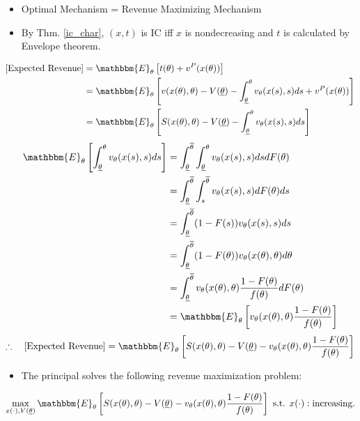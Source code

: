\documentclass[11pt,a4paper,dvipdfmx]{article}
\theoremstyle{plain}
\renewcommand{\bar}{\overline}
\newcommand{\E}{\mathbbm{E}}
\newcommand{\1}{\mathbbm{1}}
\begin{document}
\begin{itemize}
	\item Optimal Mechanism = Revenue Maximizing Mechanism
	\item By Thm. \ref{ic_char}, $(x, t)$ is IC iff $x$ is nondecreasing and $t$ is calculated by Envelope theorem.
\end{itemize}
\begin{align*}
	\text{[Expected Revenue]}
	&=
	\E_\theta \left[
	t(\theta) + v^P(x(\theta))
	\right] \\
	&=
	\E_\theta \left[
	v(x(\theta), \theta) - V(\underline{\theta}) - \int_{\underline{\theta}}^\theta
	 v_\theta(x(s), s) ds + v^P(x(\theta))
	\right] \\
	&= \E_\theta \left[
	S(x(\theta), \theta) - V(\underline{\theta}) - \int_{\underline{\theta}}^\theta
	 v_\theta(x(s), s) ds
	\right]
\end{align*}
\begin{align*}
	\E_\theta \left[
	\int_{\underline{\theta}}^\theta
	 v_\theta(x(s), s) ds
	\right]
	&=
	\int_{\underline{\theta}}^{\bar{\theta}}
	\int_{\underline{\theta}}^\theta
	 v_\theta(x(s), s) ds
	d F(\theta) \\
	&= 
	\int_{\underline{\theta}}^{\bar{\theta}}
	\int_{s}^{\bar{\theta}}
	 v_\theta(x(s), s) 
	dF(\theta) ds \\
	&= 
	\int_{\underline{\theta}}^{\bar{\theta}}
	 (1 - F(s)) v_\theta(x(s), s)
	 ds \\
	&= 
	\int_{\underline{\theta}}^{\bar{\theta}}
	 (1 - F(\theta)) v_\theta(x(\theta), \theta)
	 d\theta \\
	&= 
	\int_{\underline{\theta}}^{\bar{\theta}}
	 v_\theta(x(\theta), \theta) \frac{1 - F(\theta)}{f(\theta)}
	 dF(\theta) \\
	&=
	\E_\theta \left[
	 v_\theta(x(\theta), \theta) \frac{1 - F(\theta)}{f(\theta)}
	\right]
\end{align*}
\[
\therefore \quad
\text{[Expected Revenue]}
=
\E_\theta \left[
	S(x(\theta), \theta) - V(\underline{\theta})
	- v_\theta(x(\theta), \theta) \frac{1 - F(\theta)}{f(\theta)}
	\right]
\]
\begin{itemize}
	\item The principal solves the following revenue maximization problem:
\end{itemize}
\[
\max_{x(\cdot), V(\underline{\theta})}
\E_\theta \left[
	S(x(\theta), \theta) - V(\underline{\theta})
	- v_\theta(x(\theta), \theta) \frac{1 - F(\theta)}{f(\theta)}
	\right]
\text{ s.t. }
x(\cdot): \text{increasing.}
\]
\end{document}
